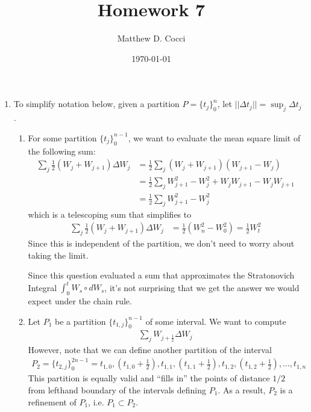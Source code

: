 \documentclass[12pt]{article}
\author{Matthew D. Cocci}
\title{Homework 7}
\date{\today}
\theoremstyle{plain}
\theoremstyle{definition}
\theoremstyle{remark}
\begin{document}
\maketitle



\begin{enumerate}
\item %
  To simplify notation below, given a partition $P= \{t_j\}_0^n$, let
  $||\Delta t_j|| = \sup_j \Delta t_j$.
  \begin{enumerate}
    \item %
      For some partition $\{t_j\}_0^{n-1}$, we want to evaluate the mean
      square limit of the following sum:
      \begin{align*}
        \sum_j \frac{1}{2} (W_j+W_{j+1}) \Delta W_j
        &= \frac{1}{2} \sum_j (W_j+W_{j+1})(W_{j+1}-W_{j}) \\
        &= \frac{1}{2} \sum_j W^2_{j+1}-W^2_{j} + W_j W_{j+1} - W_j W_{j+1}\\
        &= \frac{1}{2} \sum_j W^2_{j+1}-W^2_{j}
      \end{align*}
      which is a telescoping sum that simplifies to
      \begin{align*}
        \sum_j \frac{1}{2} (W_j+W_{j+1}) \Delta W_j
        &= \frac{1}{2} \left( W^2_n-W^2_0\right)
        = \frac{1}{2} W^2_t
      \end{align*}
      Since this is independent of the partition, we don't need to worry
      about taking the limit.

      Since this question evaluated a sum that approximates the
      Stratonovich Integral $\int^t_0 W_s \circ dW_s$, it's not
      surprising that we get the answer we would expect under the chain
      rule.

    \item %
      Let $P_1$ be a partition $\{t_{1,j}\}_0^{n-1}$ of some interval. We
      want to compute
      \begin{align*}
        \sum_j W_{j+\frac{1}{2}} \Delta W_j
      \end{align*}
      However, note that we can define another partition of the interval
      \begin{align*}
        P_2 = \{t_{2,j}\}_0^{2n-1}
        = t_{1,0}, \left( t_{1,0} + \frac{1}{2}\right), t_{1,1},
        \left(t_{1,1}+ \frac{1}{2}\right), t_{1,2},
        \left(t_{1,2}+ \frac{1}{2}\right), \ldots, t_{1,n}
      \end{align*}
      This partition is equally valid and ``fills in'' the points of
      distance $1/2$ from lefthand boundary of the intervals defining
      $P_1$. As a result, $P_2$ is a refinement of $P_1$, i.e.
      $P_1\subset P_2$.


\end{enumerate}
\end{enumerate}
\end{document}
